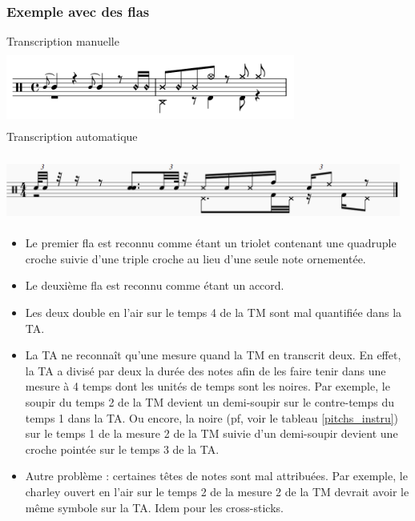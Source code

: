 \subsubsection{Exemple avec des flas}
Transcription manuelle\\
\includegraphics[height=25mm, width=95mm]{z_images/4_experimentations/1_analyse_midi_audio/2_transcriptions_flas/0_124_funk_95_fill_4-4.png}\\
Transcription automatique\\\\
\includegraphics[height=20mm, width=130mm]{z_images/4_experimentations/1_analyse_midi_audio/2_transcriptions_flas/1_124_funk_95_fill_4-4.png}\\
\begin{itemize}
	\item Le premier fla est reconnu comme étant un triolet contenant une quadruple croche suivie d’une triple croche au lieu d’une seule note ornementée.
	\item Le deuxième fla est reconnu comme étant un accord.
	\item Les deux double en l’air sur le temps 4 de la TM sont mal quantifiée dans la TA. 
	\item La TA ne reconnaît qu’une mesure quand la TM en transcrit deux. En effet, la TA a divisé par deux la durée des notes afin de les faire tenir dans une mesure à 4 temps dont les unités de temps sont les noires. Par exemple, le soupir du temps 2 de la TM devient un demi-soupir sur le contre-temps du temps 1 dans la TA. Ou encore, la noire (pf, voir le tableau \ref{pitchs_instru}) sur le temps 1 de la mesure 2 de la TM suivie d’un demi-soupir devient une croche pointée sur le temps 3 de la TA.
	\item Autre problème : certaines têtes de notes sont mal attribuées. Par exemple, le charley ouvert en l’air sur le temps 2 de la mesure 2 de la TM devrait avoir le même symbole sur la TA. Idem pour les cross-sticks.
\end{itemize}\newpage
